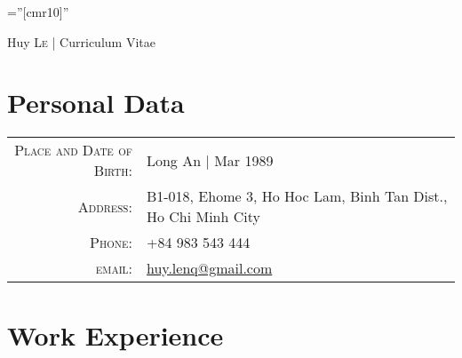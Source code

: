 \documentclass[a4paper,10pt]{article}
\begin{document}

\pagestyle{empty} %

\font\fb=''[cmr10]'' %

\par{\centering
		{\Huge Huy \textsc{Le} | Curriculum Vitae
	}\bigskip\par}

\section{Personal Data}

\begin{tabular}{rl}
    \textsc{Place and Date of Birth:} & Long An | Mar 1989 \\
    \textsc{Address:}   & B1-018, Ehome 3, Ho Hoc Lam, Binh Tan Dist., Ho Chi Minh City\\
    \textsc{Phone:}     & +84 983 543 444\\
    \textsc{email:}     & \href{mailto:huy.lenq@gmail.com}{huy.lenq@gmail.com}
\end{tabular}

\section{Work Experience}
\end{document}
